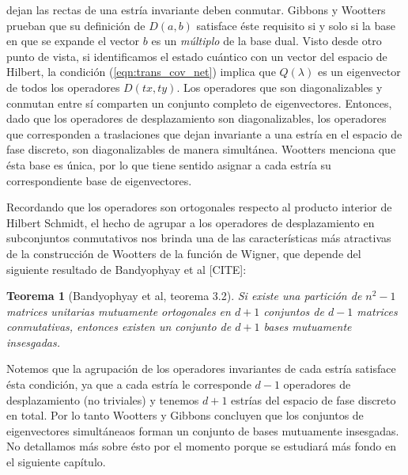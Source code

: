 \documentclass[a4paper]{report}
\newtheorem{theorem}{Teorema}
\begin{document}
  dejan las rectas de una estría invariante deben conmutar.
  Gibbons y Wootters prueban que su definición de $D(a,b)$
  satisface éste requisito si y solo si la base en que se
  expande el vector $b$ es un \textit{múltiplo} de la base
  dual. Visto desde otro punto de vista, si identificamos el
  estado cuántico con un vector del espacio de Hilbert, la
  condición (\ref{eqn:trans_cov_net}) implica que
  $Q(\lambda)$ es un eigenvector de todos los operadores
  $D(tx,ty)$. Los operadores que son diagonalizables y
  conmutan entre sí comparten un conjunto completo de
  eigenvectores. Entonces, dado que los operadores de
  desplazamiento son diagonalizables, los operadores que
  corresponden a traslaciones que dejan invariante a una
  estría en el espacio de fase discreto, son diagonalizables
  de manera simultánea. Wootters menciona que ésta base es
  única, por lo que tiene sentido asignar a cada estría su
  correspondiente base de eigenvectores.

  Recordando que los operadores son ortogonales respecto al
  producto interior de Hilbert Schmidt, el hecho de agrupar
  a los operadores de desplazamiento en subconjuntos
  conmutativos nos brinda una de las características más
  atractivas de la construcción de Wootters de la función de
  Wigner, que depende del siguiente resultado de Bandyophyay
  et al [CITE]:
  \begin{theorem}[Bandyophyay et al, teorema 3.2]
    Si existe una partición de $n^2-1$ matrices unitarias
    mutuamente ortogonales en $d+1$ conjuntos de $d-1$
    matrices conmutativas, entonces existen un conjunto de
    $d+1$ bases mutuamente insesgadas.
  \end{theorem}
  Notemos que la agrupación de los operadores invariantes de
  cada estría satisface ésta condición, ya que a cada estría
  le corresponde $d-1$ operadores de desplazamiento (no
  triviales) y tenemos $d+1$ estrías del espacio de fase
  discreto en total. Por lo tanto Wootters y Gibbons
  concluyen que los conjuntos de eigenvectores simultáneaos
  forman un conjunto de bases mutuamente insesgadas. No
  detallamos más sobre ésto por el momento porque se
  estudiará más fondo en el siguiente capítulo.
\end{document}
